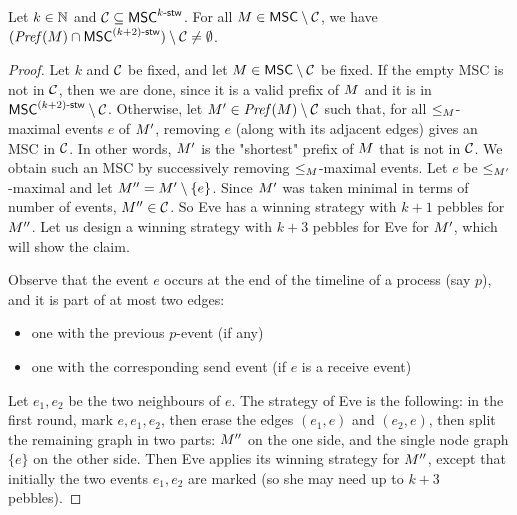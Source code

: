 \begin{lemma}\label{lem:pref_stw_k+2}
	Let $k \in \mathbb{N}$ and $\mathcal{C} \subseteq \mathsf{MSC}^{k\textup{-}\mathsf{stw}}$. For all
	$M \in \mathsf{MSC} \setminus \mathcal{C}$, we have
	$(\mathit{Pref}(M) \cap \mathsf{MSC}^{(k+2)\textup{-}\mathsf{stw}}) \setminus \mathcal{C} \neq \emptyset$.
\end{lemma}
\begin{proof}
	Let $k$ and $\mathcal{C}$ be fixed, and let
	$M\in \mathsf{MSC}\setminus \mathcal{C}$ be fixed. If the empty MSC is not in $\mathcal{C}$, then we are done, since it is a valid prefix of $M$ and it is in $\mathsf{MSC}^{(k+2)\textup{-}\mathsf{stw}} \setminus \mathcal{C}$.
	Otherwise, let $M'\in \mathit{Pref}(M) \setminus \mathcal{C}$ such that, for all $\le_M$-maximal events $e$ of $M'$, removing $e$ (along with its adjacent edges) gives an MSC in $\mathcal{C}$. In other words, $M'$ is the "shortest" prefix of $M$ that is not in $\mathcal{C}$. We obtain such an MSC by successively removing $\le_M$-maximal events. Let $e$ be $\le_{M'}$-maximal and let $M''=M' \setminus \{e\}$. Since $M'$ was taken minimal in terms of number of events,	$M''\in \mathcal{C}$.
	So Eve has a winning strategy with $k+1$ pebbles for $M''$.
	Let us design a winning strategy with $k+3$ pebbles for Eve for $M'$, which will show the claim.

	Observe that the event $e$ occurs at the end of the timeline of a process (say $p$), and it is part of at most two edges:
	\begin{itemize}
		\item one with the previous $p$-event (if any)
		\item one with the corresponding send event (if $e$ is a receive event)
	\end{itemize}
	Let $e_1,e_2$ be the two neighbours of $e$.
	The strategy of Eve is the following: in the first round, mark $e,e_1,e_2$,
	then erase the edges $(e_1,e)$ and $(e_2,e)$, then split the remaining graph
	in two parts: $M''$ on the one side, and the single node graph $\{e\}$ on
	the other side. Then Eve applies its winning strategy for $M''$, except
	that initially the two events $e_1,e_2$ are marked (so she may need up to $k+3$
	pebbles).
\end{proof}

